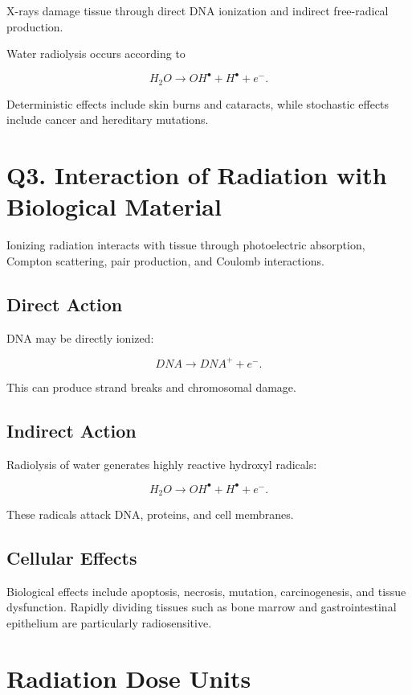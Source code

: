 \documentclass[12pt]{article}
\begin{document}
X-rays damage tissue through direct DNA ionization and indirect free-radical production.

Water radiolysis occurs according to

\[
H_2O
\rightarrow
OH^\bullet+H^\bullet+e^-.
\]

Deterministic effects include skin burns and cataracts, while stochastic effects include cancer and hereditary mutations.

\section*{Q3. Interaction of Radiation with Biological Material}

Ionizing radiation interacts with tissue through photoelectric absorption, Compton scattering, pair production, and Coulomb interactions.

\subsection*{Direct Action}

DNA may be directly ionized:

\[
DNA\rightarrow DNA^+ + e^-.
\]

This can produce strand breaks and chromosomal damage.

\subsection*{Indirect Action}

Radiolysis of water generates highly reactive hydroxyl radicals:

\[
H_2O
\rightarrow
OH^\bullet+H^\bullet+e^-.
\]

These radicals attack DNA, proteins, and cell membranes.

\subsection*{Cellular Effects}

Biological effects include apoptosis, necrosis, mutation, carcinogenesis, and tissue dysfunction. Rapidly dividing tissues such as bone marrow and gastrointestinal epithelium are particularly radiosensitive.

\section*{Radiation Dose Units}
\end{document}
